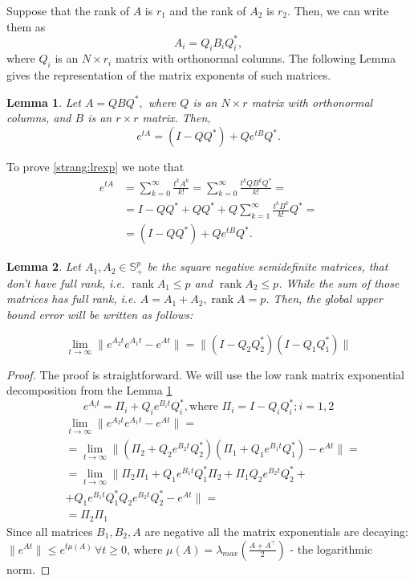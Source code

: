 \documentclass{article}
\newtheorem{lemma}{Lemma}
\begin{document}
Suppose that the rank of $A$ is $r_1$ and the rank of $A_2$ is $r_2$. Then, we can write them as
\begin{equation*}
A_i = Q_i B_i Q^*_i,
\end{equation*}
where $Q_i$ is an $N \times r_i$ matrix with orthonormal columns.  The following Lemma gives the representation of the matrix exponents of such matrices.
\begin{lemma}\label{strang:lemexp}
Let $A = Q B Q^*,$ where $Q$ is an $N \times r$ matrix with orthonormal columns, and $B$ is an $r \times r$ matrix. Then,
\begin{equation}\label{strang:lrexp}
    e^{t A}  = (I - QQ^*) + Q e^{t B} Q^*.
\end{equation}
\end{lemma}
To prove \eqref{strang:lrexp} we note that
\begin{equation*}
\begin{split}
e^{t A} &= \sum_{k=0}^{\infty} \frac{t^k A^k}{k!} = \sum_{k=0}^{\infty} \frac{t^k Q B^k Q^*}{k!} = \\ &= I - QQ^* + QQ^* + Q \sum_{k=1}^{\infty} \frac{t^k B^k}{k!} Q^* = \\ &= (I - QQ^*) + Q e^{t B} Q^*.
\end{split}
\end{equation*}

\begin{lemma}
    \label{strang:lemupper_2}
    Let $A_1, A_2 \in \mathbb{S}^p_{+}$ be the square negative semidefinite matrices, that don't have full rank, i.e. $\operatorname{rank}{A_1} \leq p$ and $\operatorname{rank}{A_2} \leq p$. While the sum of those matrices has full rank, i.e. $A = A_1 + A_2, \operatorname{rank}{A} = p$. Then, the global upper bound error will be written as follows:

    \begin{equation}\label{strang:lemupper}
        \lim_{t \to \infty}\| e^{A_2t}e^{A_1t} - e^{At}\| = \|(I - Q_2Q_2^*)(I - Q_1Q_1^*)\|
    \end{equation}
\end{lemma}
\begin{proof}
    The proof is straightforward. We will use the low rank matrix exponential decomposition from the Lemma \ref{strang:lemexp}
    $$
    e^{A_it} = \Pi_i + Q_i e^{B_it} Q_i^*, \text{where } \Pi_i = I - Q_iQ_i^*; i = 1,2
    $$
    \begin{align*}
    &\lim_{t \to \infty}\| e^{A_2t}e^{A_1t} - e^{At}\| = \\ 
    &= \lim_{t \to \infty}\| (\Pi_2 + Q_2 e^{B_2t} Q_2^*)(\Pi_1 + Q_1 e^{B_1t} Q_1^*) - e^{At}\| = \\
    &= \lim_{t \to \infty}\| \Pi_2\Pi_1 + Q_1 e^{B_1t} Q_1^*\Pi_2 + \Pi_1Q_2 e^{B_2t} Q_2^* + \\
    &+  Q_1 e^{B_1t} Q_1^* Q_2 e^{B_2t} Q_2^* - e^{At}\| =\\&= \Pi_2 \Pi_1
    \end{align*}
    Since all matrices $B_1, B_2, A$ are negative all the matrix exponentials are decaying: $\|e^{At}\|\leq e^{t\mu (A)}\, \forall t\geq 0$, where $\mu(A) = \lambda_{max} \left( \frac{A + A^\top}{2}\right)$ - the logarithmic norm.
\end{proof}
\end{document}
